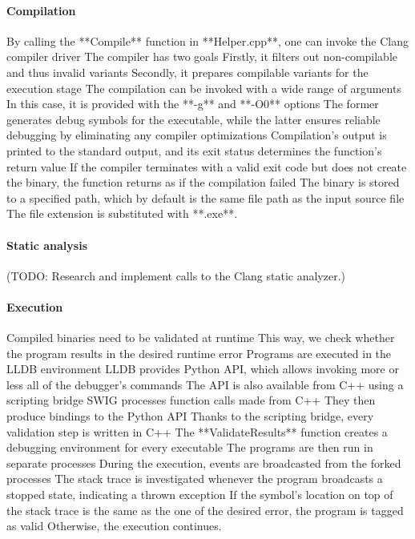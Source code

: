 {\paragraph{Compilation} By calling the **Compile** function in **Helper.cpp**, one can invoke the Clang compiler driver
The compiler has two goals
Firstly, it filters out non-compilable and thus invalid variants
Secondly, it prepares compilable variants for the execution stage
The compilation can be invoked with a wide range of arguments
In this case, it is provided with the **-g** and **-O0** options
The former generates debug symbols for the executable, while the latter ensures reliable debugging by eliminating any compiler optimizations
Compilation's output is printed to the standard output, and its exit status determines the function's return value
If the compiler terminates with a valid exit code but does not create the binary, the function returns as if the compilation failed
The binary is stored to a specified path, which by default is the same file path as the input source file
The file extension is substituted with **.exe**.

\paragraph{Static analysis} (TODO: Research and implement calls to the Clang static analyzer.)

\paragraph{Execution} Compiled binaries need to be validated at runtime
This way, we check whether the program results in the desired runtime error
Programs are executed in the LLDB environment
LLDB provides Python API, which allows invoking more or less all of the debugger's commands
The API is also available from C++ using a scripting bridge
SWIG processes function calls made from C++
They then produce bindings to the Python API
Thanks to the scripting bridge, every validation step is written in C++
The **ValidateResults** function creates a debugging environment for every executable
The programs are then run in separate processes
During the execution, events are broadcasted from the forked processes
The stack trace is investigated whenever the program broadcasts a stopped state, indicating a thrown exception
If the symbol's location on top of the stack trace is the same as the one of the desired error, the program is tagged as valid
Otherwise, the execution continues.


}

